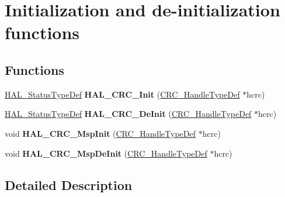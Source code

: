 \hypertarget{group___c_r_c___exported___functions___group1}{}\section{Initialization and de-\/initialization functions}
\label{group___c_r_c___exported___functions___group1}
\subsection*{Functions}
\begin{DoxyCompactItemize}
\item 
\hyperlink{stm32f4xx__hal__def_8h_a63c0679d1cb8b8c684fbb0632743478f}{H\+A\+L\+\_\+\+Status\+Type\+Def} {\bfseries H\+A\+L\+\_\+\+C\+R\+C\+\_\+\+Init} (\hyperlink{struct_c_r_c___handle_type_def}{C\+R\+C\+\_\+\+Handle\+Type\+Def} $\ast$hcrc)\hypertarget{group___c_r_c___exported___functions___group1_ga23e7df2eaecf59615e13b2cad8b7185f}{}\label{group___c_r_c___exported___functions___group1_ga23e7df2eaecf59615e13b2cad8b7185f}

\item 
\hyperlink{stm32f4xx__hal__def_8h_a63c0679d1cb8b8c684fbb0632743478f}{H\+A\+L\+\_\+\+Status\+Type\+Def} {\bfseries H\+A\+L\+\_\+\+C\+R\+C\+\_\+\+De\+Init} (\hyperlink{struct_c_r_c___handle_type_def}{C\+R\+C\+\_\+\+Handle\+Type\+Def} $\ast$hcrc)\hypertarget{group___c_r_c___exported___functions___group1_gac600b9a1785f2372ca40ed5449c23739}{}\label{group___c_r_c___exported___functions___group1_gac600b9a1785f2372ca40ed5449c23739}

\item 
void {\bfseries H\+A\+L\+\_\+\+C\+R\+C\+\_\+\+Msp\+Init} (\hyperlink{struct_c_r_c___handle_type_def}{C\+R\+C\+\_\+\+Handle\+Type\+Def} $\ast$hcrc)\hypertarget{group___c_r_c___exported___functions___group1_ga5167ffd293de5d86f5873910416b36d0}{}\label{group___c_r_c___exported___functions___group1_ga5167ffd293de5d86f5873910416b36d0}

\item 
void {\bfseries H\+A\+L\+\_\+\+C\+R\+C\+\_\+\+Msp\+De\+Init} (\hyperlink{struct_c_r_c___handle_type_def}{C\+R\+C\+\_\+\+Handle\+Type\+Def} $\ast$hcrc)\hypertarget{group___c_r_c___exported___functions___group1_gac19b8df939b3490e690bdf1e1e04ead3}{}\label{group___c_r_c___exported___functions___group1_gac19b8df939b3490e690bdf1e1e04ead3}

\end{DoxyCompactItemize}


\subsection{Detailed Description}
